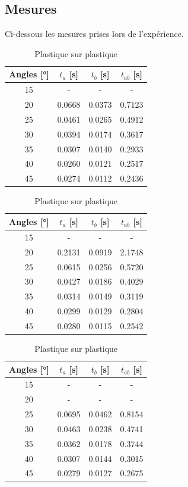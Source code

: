 \documentclass[twoside,twocolumn]{article}
\begin{document}
\subsection{Mesures}
Ci-dessous les mesures prises lors de l'expérience.
\begin{table}[H]
\centering

\caption{Bois sur Bois}
\begin{tabular}{|c|c|c|c|}
\hline
Angles [°] & $t_a$ [s] & $t_b$ [s] & $t_{ab}$ [s] \\
\hline \hline
15 & - & - & - \\
\hline
20 & 0.0668 & 0.0373 & 0.7123 \\
\hline
25 & 0.0461 & 0.0265 & 0.4912 \\
\hline
30 & 0.0394 & 0.0174 & 0.3617 \\
\hline
35 & 0.0307 & 0.0140 & 0.2933 \\
\hline
40 & 0.0260 & 0.0121 & 0.2517 \\
\hline
45 & 0.0274 & 0.0112 & 0.2436 \\
\hline
\end{tabular}
\label{table:mesurebb}

\caption{Bois sur plastique}
\begin{tabular}{|c|c|c|c|}
\hline
Angles [°] & $t_a$ [s] & $t_b$ [s] & $t_{ab}$ [s] \\
\hline \hline
15 & - & - & - \\
\hline
20 & 0.2131 & 0.0919 & 2.1748 \\
\hline
25 & 0.0615 & 0.0256 & 0.5720 \\
\hline
30 & 0.0427 & 0.0186 & 0.4029 \\
\hline
35 & 0.0314 & 0.0149 & 0.3119 \\
\hline
40 & 0.0299 & 0.0129 & 0.2804 \\
\hline
45 & 0.0280 & 0.0115 & 0.2542 \\
\hline
\end{tabular}
\label{table:mesurebp}

\caption{Plastique sur plastique}
\begin{tabular}{|c|c|c|c|}
\hline
Angles [°] & $t_a$ [s] & $t_b$ [s] & $t_{ab}$ [s] \\
\hline \hline
15 & - & - & - \\
\hline
20 & - & - & - \\
\hline
25 & 0.0695 & 0.0462 & 0.8154 \\
\hline
30 & 0.0463 & 0.0238 & 0.4741 \\
\hline
35 & 0.0362 & 0.0178 & 0.3744 \\
\hline
40 & 0.0307 & 0.0144 & 0.3015 \\
\hline
45 & 0.0279 & 0.0127 & 0.2675 \\
\hline
\end{tabular}
\label{table:mesurepp}


\end{table}
\end{document}
